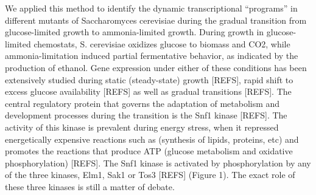 \documentclass{bioinfo}
\begin{document}
We applied this method to identify the dynamic transcriptional
``programs'' in different mutants of Saccharomyces cerevisiae during the
gradual transition from glucose-limited growth to ammonia-limited
growth. During growth in glucose-limited chemostats, S. cerevisiae
oxidizes glucose to biomass and CO2, while ammonia-limitation induced
partial fermentative behavior, as indicated by the production of
ethanol. Gene expression under either of these conditions has been
extensively studied during static (steady-state) growth [REFS], rapid
shift to excess glucose availability [REFS] as well as gradual
transitions [REFS]. The central regulatory protein that governs the
adaptation of metabolism and development processes during the
transition is the Snf1 kinase [REFS]. The activity of this kinase is
prevalent during energy stress, when it repressed energetically
expensive reactions such as (synthesis of lipids, proteins, etc) and
promotes the reactions that produce ATP (glucose metabolism and
oxidative phosphorylation) [REFS]. The Snf1 kinase is activated by
phosphorylation by any of the three kinases, Elm1, Sak1 or Tos3 [REFS]
(Figure 1). The exact role of these three kinases is still a matter of
debate. 
\end{document}
